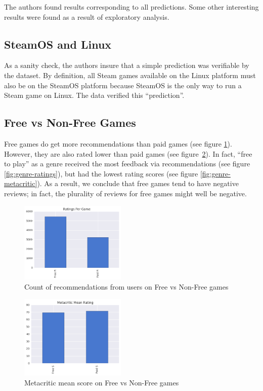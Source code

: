 \documentclass[letterpaper,10pt,twocolumn]{article}
\begin{document}
The authors found results corresponding to all predictions. Some other interesting
results were found as a result of exploratory analysis.

\subsection{SteamOS and Linux}

As a sanity check, the authors insure that a simple prediction was verifiable
by the dataset. By definition, all Steam games available on the Linux platform
must also be on the SteamOS platform because SteamOS is the only way to run a Steam
game on Linux. The data verified this ``prediction''.

\subsection{Free vs Non-Free Games}

Free games do get more recommendations than paid games (see figure
\ref{fig:freevnon-ratings}). However, they are also rated lower than paid
games (see figure~\ref{fig:freevnon-metacritic}). In fact, ``free to play'' as a
genre received the most feedback via recommendations (see figure
\ref{fig:genre-ratings}), but had the lowest rating scores (see figure
\ref{fig:genre-metacritic}). As a result, we conclude that free games tend to
have negative reviews; in fact, the plurality of reviews for free games might
well be negative.

\begin{figure}[h]
    \caption{Count of recommendations from users on Free vs Non-Free games \label{fig:freevnon-ratings}}
    \includegraphics[width=0.45\textwidth,keepaspectratio]{freevnon-ratings-bar}
\end{figure}

\begin{figure}[h]
    \caption{Metacritic mean score on Free vs Non-Free games \label{fig:freevnon-metacritic}}
    \includegraphics[width=0.45\textwidth,keepaspectratio]{freevnon-metacritic-bar}
\end{figure}
\end{document}
